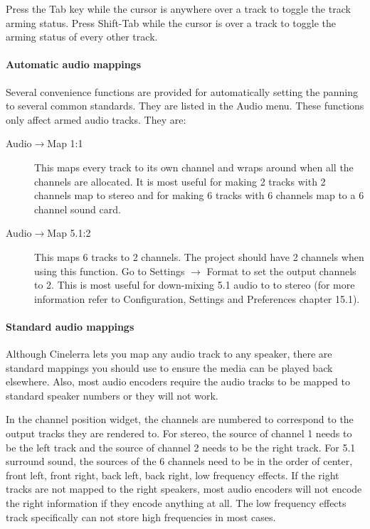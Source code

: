 Press the Tab key while the cursor is anywhere over a track to toggle the track arming status. Press Shift-Tab while the cursor is over a track to toggle the arming status of every other track.

\paragraph{Automatic audio mappings}
Several convenience functions are provided for automatically setting the panning to several common standards. They are listed in the Audio menu. These functions only affect armed audio tracks. They are:

    \begin{description}
        \item[Audio$\rightarrow$Map 1:1] This maps every track to its own channel and wraps around when all the channels are allocated. It is most useful for making 2 tracks with 2 channels map to stereo and for making 6 tracks with 6 channels map to a 6 channel sound card.
        \item[Audio$\rightarrow$Map 5.1:2] This maps 6 tracks to 2 channels. The project should have 2 channels when using this function. Go to Settings $\rightarrow$ Format to set the output channels to 2. This is most useful for down-mixing 5.1 audio to to stereo (for more information refer to Configuration, Settings and Preferences chapter 15.1).
    \end{description}

\paragraph{Standard audio mappings} Although Cinelerra lets you map any audio track to any speaker, there are standard mappings you should use to ensure the media can be played back elsewhere. Also, most audio encoders require the audio tracks to be mapped to standard speaker numbers or they will not work.

In the channel position widget, the channels are numbered to correspond to the output tracks they are rendered to. For stereo, the source of channel 1 needs to be the left track and the source of channel 2 needs to be the right track.  For 5.1 surround sound, the sources of the 6 channels need to be in the order of center, front left, front right, back left, back right, low frequency effects. If the right tracks are not mapped to the right speakers, most audio encoders will not encode the right information if they encode anything at all. The low frequency effects track specifically can not store high frequencies in
most cases.

